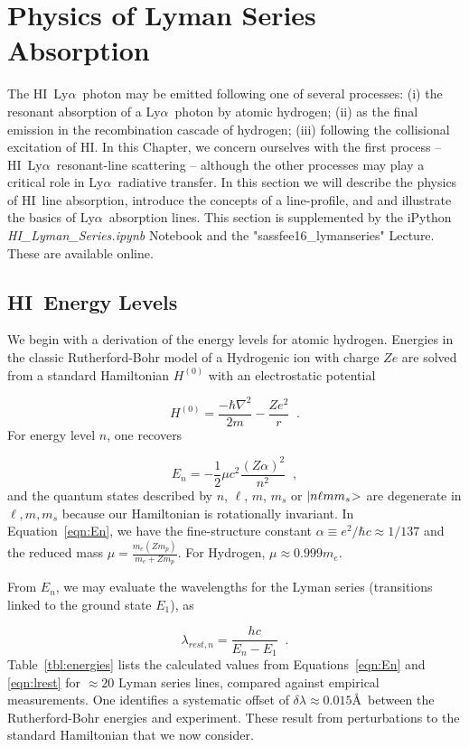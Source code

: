 \documentclass[graybox]{svmult}
\newcommand{\HI}{H{\sc I}}
\def\lya{Ly$\alpha$}
\def\ohf{\frac{1}{2}}
\def\ket#1{{|#1\negmedspace>}}
\begin{document}
\section{Physics of Lyman Series Absorption}
\label{sec:physics}

The \HI\ \lya\ photon may be emitted following one
of several processes:
 (i) the resonant absorption of a \lya\ photon by atomic hydrogen;
 (ii) as the final emission in the recombination cascade of hydrogen;
 (iii) following the collisional excitation of \HI.
In this Chapter, we concern ourselves with the first process --
\HI\ \lya\ resonant-line scattering -- although the other
processes may play a critical role in \lya\ radiative transfer.
In this section we will
  describe the physics of \HI\ line absorption,
  introduce the concepts of a line-profile, and
  and illustrate the basics of \lya\ absorption lines.
This section is supplemented by the iPython 
{\it HI\_Lyman\_Series.ipynb} Notebook
and the "sassfee16\_lymanseries" Lecture.
These are available online.

\subsection{\HI\ Energy Levels}

We begin with a derivation of the energy levels 
for atomic hydrogen.  Energies in the classic
Rutherford-Bohr model of a Hydrogenic ion with charge
$Ze$ are solved from a standard Hamiltonian $H^{(0)}$
with an electrostatic potential

\begin{equation}
H^{(0)} = \frac{-\hbar \nabla^2}{2m} - \frac{Z e^2}{r} \;\; .
\end{equation}
For energy level $n$, one recovers

\begin{equation}
E_n = -\ohf \mu c^2 \frac{(Z \alpha)^2}{n^2} \;\; ,
\label{eqn:En}
\end{equation}
and the quantum states described by $n$, $\ell$, $m$, $m_s$
or $\ket{n \ell m m_s}$ 
are degenerate in $\ell, m, m_s$
because our Hamiltonian is rotationally invariant.
In Equation~\ref{eqn:En}, we have
the fine-structure constant 
$\alpha \equiv e^2/\hbar c \approx 1/137$ and
the reduced mass $\mu = \frac{m_e (Z m_p)}{m_e + Z m_p}$.
For Hydrogen, $\mu \approx 0.999 m_e$. 

From $E_n$, we may evaluate the wavelengths for the Lyman
series (transitions linked to the ground state $E_1$), as

\begin{equation}
\lambda_{rest,n} = \frac{hc}{E_n - E_1} \;\; .
\label{eqn:lrest}
\end{equation}
Table~\ref{tbl:energies} lists the calculated values 
from Equations~\ref{eqn:En} and \ref{eqn:lrest}
for $\approx 20$ Lyman series lines, compared against
empirical measurements.  One identifies a systematic
offset of $\delta\lambda \approx 0.015$\AA\ between
the Rutherford-Bohr energies and experiment.
These result from perturbations to the 
standard Hamiltonian that we now consider.
\end{document}
